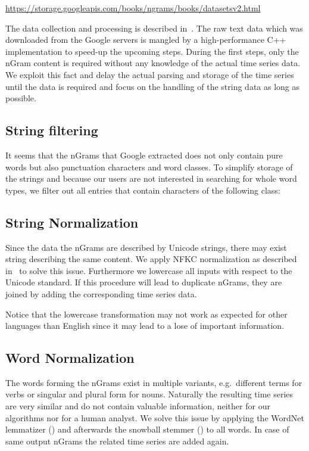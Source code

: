 \url{https://storage.googleapis.com/books/ngrams/books/datasetsv2.html}

The data collection and processing is described in~\cite{Google_nGrams}. The raw text data which was downloaded from the Google servers is mangled by a high-performance C++ implementation to speed-up the upcoming steps. During the first steps, only the nGram content is required without any knowledge of the actual time series data. We exploit this fact and delay the actual parsing and storage of the time series until the data is required and focus on the handling of the string data as long as possible.


\subsection{String filtering}
\label{ssec:baseline:data:filter}
It seems that the nGrams that Google extracted does not only contain pure words but also punctuation characters and word classes. To simplify storage of the strings and because our users are not interested in searching for whole word types, we filter out all entries that contain characters of the following class:

\code{\[\_.\slash{},:;!?\textbackslash'"\#()<>=+*\{\}0-9\]}

\subsection{String Normalization}
\label{ssec:baseline:data:snorm}
Since the data the nGrams are described by Unicode strings, there may exist string describing the same content. We apply NFKC normalization as described in~\cite{unicode8annex15} to solve this issue. Furthermore we lowercase all inputs with respect to the Unicode standard. If this procedure will lead to duplicate nGrams, they are joined by adding the corresponding time series data.

Notice that the lowercase transformation may not work as expected for other languages than English since it may lead to a lose of important information.


\subsection{Word Normalization}
\label{ssec:baseline:data:wnorm}
The words forming the nGrams exist in multiple variants, e.g.\ different terms for verbs or singular and plural form for nouns. Naturally the resulting time series are very similar and do not contain valuable information, neither for our algorithms nor for a human analyst. We solve this issue by applying the WordNet lemmatizer (\cite{wordnet}) and afterwards the snowball stemmer (\cite{porter2}) to all words. In case of same output nGrams the related time series are added again.

